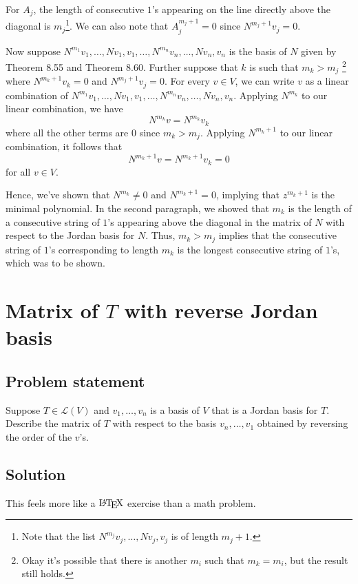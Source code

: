 \documentclass{article}
\begin{document}
For $A_j$, the length of consecutive $1$'s appearing on the line directly above the diagonal is $m_j$\footnote{Note that the list $N^{m_j}v_j,\ldots,Nv_j,v_j$ is of length $m_j+1$.}. 
We can also note that $A_j^{m_j+1}=0$ since $N^{m_j+1}v_j=0$.

Now suppose $N^{m_1}v_1,\ldots,Nv_1,v_1,\ldots,N^{m_n}v_n,\ldots,Nv_n,v_n$ is the basis of $N$ given by Theorem 8.55 and Theorem 8.60. 
Further suppose that $k$ is such that $m_k > m_j$
\footnote{Okay it's possible that there is another $m_i$ such that $m_k=m_i$, but the result still holds.} 
where $N^{m_k+1}v_k=0$ and $N^{m_j+1}v_j=0$. 
For every $v\in V$, we can write $v$ as a linear combination of $N^{m_1}v_1,\ldots,Nv_1,v_1,\ldots,N^{m_n}v_n,\ldots,Nv_n,v_n$. 
Applying $N^{m_k}$ to our linear combination, we have 
\[N^{m_k}v=N^{m_k}v_k\]
where all the other terms are $0$ since $m_k > m_j$. 
Applying $N^{m_k+1}$ to our linear combination, it follows that
\[N^{m_k+1}v=N^{m_k+1}v_k=0\]
for all $v\in V$.

Hence, we've shown that $N^{m_k}\neq0$ and $N^{m_k+1}=0$, implying that $z^{m_k+1}$ is the minimal polynomial. 
In the second paragraph, we showed that $m_k$ is the length of a consecutive string of $1$'s appearing above the diagonal in the matrix of $N$ with respect to the Jordan basis for $N$. 
Thus, $m_k > m_j$ implies that the consecutive string of $1$'s corresponding to length $m_k$ is the longest consecutive string of $1$'s, which was to be shown.

\clearpage

\section{Matrix of $T$ with reverse Jordan basis}
\subsection*{Problem statement}
Suppose $T\in\mathcal{L}(V)$ and $v_1,\dots,v_n$ is a basis of $V$ that is a Jordan basis for $T$. Describe the matrix of $T$ with respect to the basis $v_n,\ldots,v_1$ obtained by reversing the order of the $v$'s.

\subsection*{Solution}
This feels more like a $\text{\LaTeX}$ exercise than a math problem.
\end{document}
